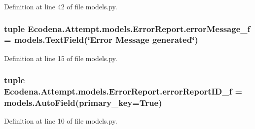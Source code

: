 Definition at line 42 of file models.py.

\hypertarget{class_ecodena_1_1_attempt_1_1models_1_1_error_report_ac3c6ddeb8bb514c31ef17a8b2c61fbbe}{
\subsubsection[{errorMessage\_\-f}]{\setlength{\rightskip}{0pt plus 5cm}tuple {\bf Ecodena.Attempt.models.ErrorReport.errorMessage\_\-f} = models.TextField(\char`\"{}Error Message generated\char`\"{})}}
\label{df/d02/class_ecodena_1_1_attempt_1_1models_1_1_error_report_ac3c6ddeb8bb514c31ef17a8b2c61fbbe}


Definition at line 15 of file models.py.

\hypertarget{class_ecodena_1_1_attempt_1_1models_1_1_error_report_a2af69996b9b6d05f1bdfeff5d05f1fc6}{
\subsubsection[{errorReportID\_\-f}]{\setlength{\rightskip}{0pt plus 5cm}tuple {\bf Ecodena.Attempt.models.ErrorReport.errorReportID\_\-f} = models.AutoField(primary\_\-key=True)}}
\label{df/d02/class_ecodena_1_1_attempt_1_1models_1_1_error_report_a2af69996b9b6d05f1bdfeff5d05f1fc6}


Definition at line 10 of file models.py.

\hypertarget{class_ecodena_1_1_attempt_1_1models_1_1_error_report_af26b1061aca87017c2a7297692ad08ac}{
\subsubsection[{errorType\_\-f}]{}}
\label{df/d02/class_ecodena_1_1_attempt_1_1models_1_1_error_report_af26b1061aca87017c2a7297692ad08ac}


